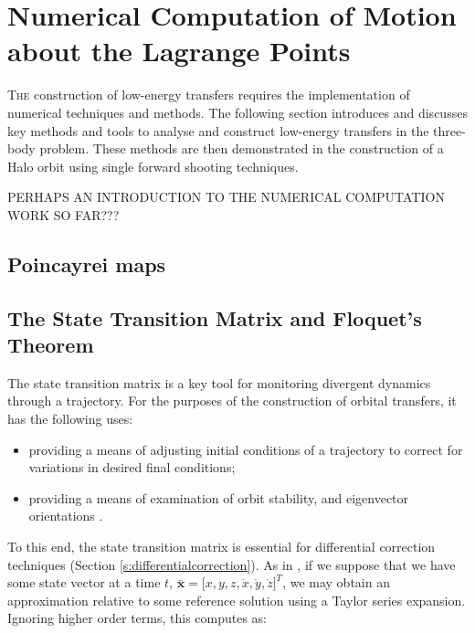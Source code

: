                                                                                                                                                                                                                                                                                                                                                                                                                                                                                                                
\chapter{Numerical Computation of Motion about the Lagrange Points}

\lettrine{T}{he} construction of low-energy transfers requires the implementation of numerical techniques and methods. The following section introduces and discusses key methods and tools to analyse and construct low-energy transfers in the three-body problem. These methods are then demonstrated in the construction of a Halo orbit using single forward shooting techniques.

PERHAPS AN INTRODUCTION TO THE NUMERICAL COMPUTATION WORK SO FAR???

\section{Poincayrei maps}

\section{The State Transition Matrix and Floquet's Theorem}

The state transition matrix is a key tool for monitoring divergent dynamics through a trajectory. For the purposes of the construction of orbital transfers, it has the following uses:

\begin{itemize}
\item  providing a means of adjusting initial conditions of a trajectory to correct for variations in desired final conditions;
\item providing a means of examination of orbit stability, and eigenvector orientations \citep{Parker2014}.
\end{itemize}

 To this end, the state transition matrix is essential for differential correction techniques (Section \ref{s:differentialcorrection}). As in \citep{Howell1997}, if we suppose that we have some state vector at a time $t$, $\pmb{\bar{x}} = [ x, y, z, \dot{x}, \dot{y}, \dot{z} \big ]^T$, we may obtain an approximation relative to some reference solution using a Taylor series expansion. Ignoring higher order terms, this computes as:
 
